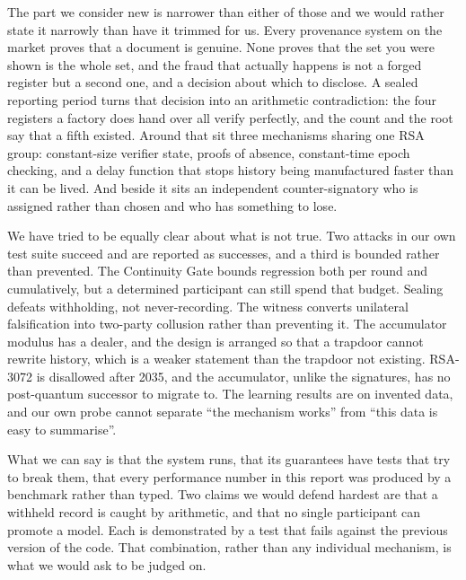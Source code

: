 \documentclass[11pt,a4paper]{article}
\begin{document}
The part we consider new is narrower than either of those and we would rather
state it narrowly than have it trimmed for us. Every provenance system on the
market proves that a document is genuine. None proves that the set you were shown
is the whole set, and the fraud that actually happens is not a forged register
but a second one, and a decision about which to disclose. A sealed reporting
period turns that decision into an arithmetic contradiction: the four registers a
factory does hand over all verify perfectly, and the count and the root say that
a fifth existed. Around that sit three mechanisms sharing one RSA group:
constant-size verifier state, proofs of absence, constant-time epoch checking, and
a delay function that stops history being manufactured faster than it can be
lived. And beside it sits an independent counter-signatory who is assigned rather
than chosen and who has something to lose.

We have tried to be equally clear about what is not true. Two attacks in our own
test suite succeed and are reported as successes, and a third is bounded rather
than prevented. The Continuity Gate bounds regression both per round and
cumulatively, but a determined participant can still spend that budget. Sealing
defeats withholding, not never-recording. The witness converts unilateral falsification into two-party
collusion rather than preventing it. The accumulator modulus has a dealer, and the
design is arranged so that a trapdoor cannot rewrite history, which is a weaker
statement than the trapdoor not existing. RSA-3072 is disallowed after 2035, and
the accumulator, unlike the signatures, has no post-quantum successor to migrate
to. The learning results are on invented data, and our own probe cannot separate
``the mechanism works'' from ``this data is easy to summarise''.

What we can say is that the system runs, that its guarantees have tests that try
to break them, that every performance number in this report was produced by a
benchmark rather than typed. Two claims we would defend hardest are that a
withheld record is caught by arithmetic, and that no single participant can
promote a model. Each is demonstrated by a test that fails against the previous version
of the code. That combination, rather than any individual mechanism, is what we
would ask to be judged on.

\small
\begingroup


\endgroup
\end{document}
